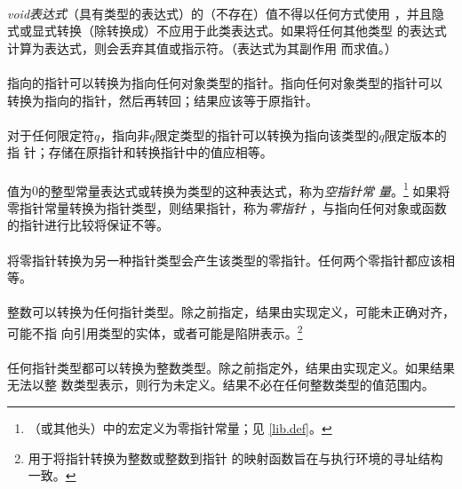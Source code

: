 
\paragraph{}
\textit{void表达式}（具有类型的表达式）的（不存在）值不得以任何方式使用
，并且隐式或显式转换（除转换成）不应用于此类表达式。如果将任何其他类型
的表达式计算为表达式，则会丢弃其值或指示符。（表达式为其副作用
而求值。）

\paragraph{}
指向的指针可以转换为指向任何对象类型的指针。指向任何对象类型的指针可以
转换为指向的指针，然后再转回；结果应该等于原指针。

\paragraph{}
对于任何限定符$q$，指向非$q$限定类型的指针可以转换为指向该类型的$q$限定版本的指
针；存储在原指针和转换指针中的值应相等。

\paragraph{}
值为$0$的整型常量表达式或转换为类型的这种表达式，称为\textit{空指针常
量}。\footnote{（或其他头）中的宏定义为零指针常量；见
\ref{lib.def}。} 如果将零指针常量转换为指针类型，则结果指针，称为\textit{零指针}
，与指向任何对象或函数的指针进行比较将保证不等。

\paragraph{}
将零指针转换为另一种指针类型会产生该类型的零指针。任何两个零指针都应该相等。

\paragraph{}
整数可以转换为任何指针类型。除之前指定，结果由实现定义，可能未正确对齐，可能不指
向引用类型的实体，或者可能是陷阱表示。\footnote{用于将指针转换为整数或整数到指针
的映射函数旨在与执行环境的寻址结构一致。}

\paragraph{}
任何指针类型都可以转换为整数类型。除之前指定外，结果由实现定义。如果结果无法以整
数类型表示，则行为未定义。结果不必在任何整数类型的值范围内。

